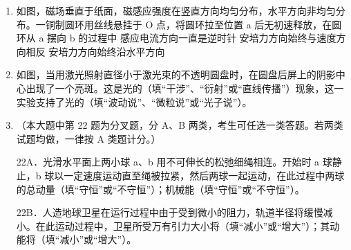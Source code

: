 \documentclass[\gkver]{gaokaozhenti}
\begin{document}
\begin{enumerate}
\item
如图，磁场垂直于纸面，磁感应强度在竖直方向均匀分布，水平方向非均匀分布。一铜制圆环用丝线悬挂于 O 点，将圆环拉至位置 a 后无初速释放，在圆环从 a 摆向 b 的过程中
\onepicture[h=3.74cm]{}
{感应电流方向一直是逆时针}
{安培力方向始终与速度方向相反}
{安培力方向始终沿水平方向}

\item
如图，当用激光照射直径小于激光束的不透明圆盘时，在圆盘后屏上的阴影中心出现了一个亮斑。这是光的（填“干涉”、“衍射”或“直线传播”）现象，这一实验支持了光的（填“波动说”、“微粒说”或“光子说”）。

\item
（本大题中第 22 题为分叉题，分 A、B 两类，考生可任选一类答题。若两类试题均做，一律按 A 类题计分。）

22A．光滑水平面上两小球 a、b 用不可伸长的松弛细绳相连。开始时 a 球静止，b 球以一定速度运动直至绳被拉紧，然后两球一起运动，在此过程中两球的总动量（填“守恒”或“不守恒”）；机械能（填“守恒”或“不守恒”）。

22B．人造地球卫星在运行过程中由于受到微小的阻力，轨道半径将缓慢减小。在此运动过程中，卫星所受万有引力大小将（填“减小”或“增大”）；其动能将（填“减小”或“增大”）。
\end{enumerate}
\end{document}
